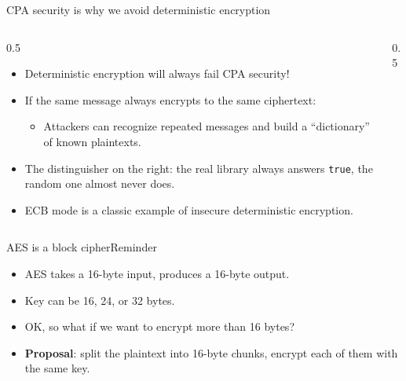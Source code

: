 \ifdefined\PRESENTATION\else\PassOptionsToClass{handout}{beamer}\fi\documentclass[aspectratio=169, lualatex]{beamer}
\begin{document}
\begin{frame}{CPA security is why we avoid deterministic encryption}
	\begin{columns}[c]
		\begin{column}{0.5\textwidth}
			\begin{itemize}
				\item Deterministic encryption will always fail CPA security!
				\item If the same message always encrypts to the same ciphertext:
				      \begin{itemize}
					      \item Attackers can recognize repeated messages and build a ``dictionary'' of known plaintexts.
				      \end{itemize}
				\item The distinguisher on the right: the real library always answers \texttt{true}, the random one almost never does.
				\item ECB mode is a classic example of insecure deterministic encryption.
			\end{itemize}
		\end{column}
		\begin{column}{0.5\textwidth}
			\begin{center}
			\end{center}
		\end{column}
	\end{columns}
\end{frame}

\begin{frame}{AES is a block cipher}{Reminder}
	\begin{itemize}
		\item<1-2> AES takes a 16-byte input, produces a 16-byte output.
		\item<1-2> Key can be 16, 24, or 32 bytes.
		\item<1-2> OK, so what if we want to encrypt more than 16 bytes? \pause
		\item<2-2> \textbf{Proposal}: split the plaintext into 16-byte chunks, encrypt each of them with the same key.
	\end{itemize}
\end{frame}
\end{document}
